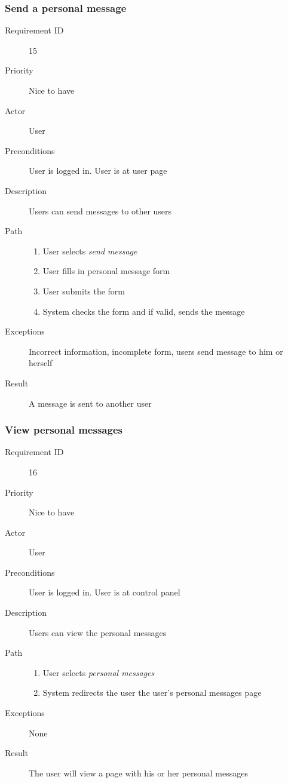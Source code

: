 		\subsubsection{Send a personal message}
			\begin{description}
				\item[Requirement ID] 15
				\item[Priority] Nice to have
				\item[Actor] User
				\item[Preconditions] User is logged in. User is at user page
				\item[Description] Users can send messages to other users
				\item[Path]
 					\begin{enumerate}
						\item User selects \emph{send message}
						\item User fills in personal message form
						\item User submits the form
						\item System checks the form and if valid, sends the message
					\end{enumerate}
				\item[Exceptions] Incorrect information, incomplete form, users send message to him or herself
				\item[Result] A message is sent to another user
			\end{description}
		\subsubsection{View personal messages}
			\begin{description}
				\item[Requirement ID] 16
				\item[Priority] Nice to have
				\item[Actor] User
				\item[Preconditions] User is logged in. User is at control panel
				\item[Description] Users can view the personal messages
				\item[Path]
 					\begin{enumerate}
						\item User selects \emph{personal messages}
						\item System redirects the user the user's personal messages page
					\end{enumerate}
				\item[Exceptions] None
				\item[Result] The user will view a page with his or her personal messages
			\end{description}
